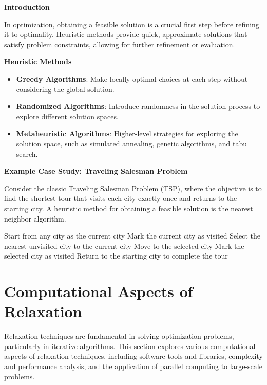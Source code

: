 \documentclass[12pt]{book} %
\begin{document}
\textbf{Introduction}

In optimization, obtaining a feasible solution is a crucial first step before refining it to optimality. Heuristic methods provide quick, approximate solutions that satisfy problem constraints, allowing for further refinement or evaluation.

\textbf{Heuristic Methods}

\begin{itemize}
    \item \textbf{Greedy Algorithms}: Make locally optimal choices at each step without considering the global solution.
    \item \textbf{Randomized Algorithms}: Introduce randomness in the solution process to explore different solution spaces.
    \item \textbf{Metaheuristic Algorithms}: Higher-level strategies for exploring the solution space, such as simulated annealing, genetic algorithms, and tabu search.
\end{itemize}


\textbf{Example Case Study: Traveling Salesman Problem}

Consider the classic Traveling Salesman Problem (TSP), where the objective is to find the shortest tour that visits each city exactly once and returns to the starting city. A heuristic method for obtaining a feasible solution is the nearest neighbor algorithm.
\FloatBarrier
\begin{algorithm}
\caption{Nearest Neighbor Algorithm for TSP}
\begin{algorithmic}[1]
\State Start from any city as the current city
\State Mark the current city as visited
    \State Select the nearest unvisited city to the current city
    \State Move to the selected city
    \State Mark the selected city as visited
\EndWhile
\State Return to the starting city to complete the tour
\end{algorithmic}
\end{algorithm}
\FloatBarrier


\section{Computational Aspects of Relaxation}

Relaxation techniques are fundamental in solving optimization problems, particularly in iterative algorithms. This section explores various computational aspects of relaxation techniques, including software tools and libraries, complexity and performance analysis, and the application of parallel computing to large-scale problems.
\end{document}
